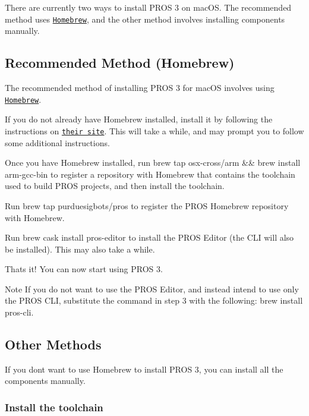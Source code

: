 There are currently two ways to install P\+R\+OS 3 on mac\+OS. The recommended method uses \href{https://brew.sh/}{\tt Homebrew}, and the other method involves installing components manually.

\subsection*{Recommended Method (Homebrew)}

The recommended method of installing P\+R\+OS 3 for mac\+OS involves using \href{https://brew.sh/}{\tt Homebrew}.


\begin{DoxyEnumerate}
\item If you do not already have Homebrew installed, install it by following the instructions on \href{https://brew.sh}{\tt their site}. This will take a while, and may prompt you to follow some additional instructions.
\item Once you have Homebrew installed, run {\ttfamily brew tap osx-\/cross/arm \&\& brew install arm-\/gcc-\/bin} to register a repository with Homebrew that contains the toolchain used to build P\+R\+OS projects, and then install the toolchain.
\item Run {\ttfamily brew tap purduesigbots/pros} to register the P\+R\+OS Homebrew repository with Homebrew.
\item Run {\ttfamily brew cask install pros-\/editor} to install the P\+R\+OS Editor (the C\+LI will also be installed). This may also take a while.
\item That\textquotesingle{}s it! You can now start using P\+R\+OS 3.
\end{DoxyEnumerate}

\begin{DoxyNote}{Note}
If you do not want to use the P\+R\+OS Editor, and instead intend to use only the P\+R\+OS C\+LI, substitute the command in step 3 with the following\+: brew install pros-\/cli.
\end{DoxyNote}
\subsection*{Other Methods}

If you don\textquotesingle{}t want to use Homebrew to install P\+R\+OS 3, you can install all the components manually.

\subsubsection*{Install the toolchain}


